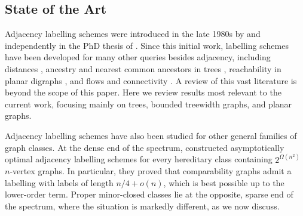 \documentclass{patmorin}
\begin{document}
\subsection{State of the Art}
\label{ssec:state-of-art}

Adjacency labelling schemes were introduced in the late 1980s by \citet{kannan.naor.ea:implicit} and independently in the PhD thesis of \citet{muller:local}. Since this initial work, labelling schemes have been developed for many other queries besides adjacency, including distances \citep{GAVOILLE200485}, ancestry and nearest common ancestors in
trees \citep{AKM01,alstrup.rauhe:improved,DBLP:journals/mst/AlstrupGKR04}, reachability in planar
digraphs \citep{DBLP:journals/jacm/Thorup04,DBLP:conf/focs/HolmRT15}, and flows and connectivity \citep{DBLP:journals/siamcomp/KatzKKP04}. A review of this vast literature is beyond the scope of this paper. Here we review results most relevant to the current work, focusing mainly on trees, bounded treewidth graphs, and planar graphs.

Adjacency labelling schemes have also been studied for other general families of graph classes. At the dense end of the spectrum, \citet{DBLP:conf/stoc/BonamyEGS21} constructed
asymptotically optimal adjacency labelling schemes for every hereditary class
containing $2^{\Omega(n^2)}$ $n$-vertex graphs. In particular, they proved that comparability graphs admit a labelling with labels of length $n/4+o(n)$, which is best possible up to the lower-order term. Proper minor-closed classes lie at the opposite, sparse end of the spectrum, where the situation is markedly different, as we now discuss.
\end{document}
